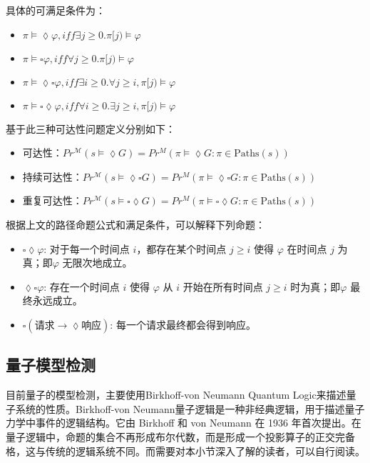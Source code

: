 具体的可满足条件为：
\begin{itemize}
    \item \(\pi\models\lozenge\varphi,iff\exists j\ge0.\pi[j)\models\varphi\)
    \item \(\pi\models\square\varphi,iff\forall j\ge 0.\pi[j)\models\varphi\)
    \item \(\pi\models\lozenge\square\varphi,iff\exists i\ge 0.\forall j\ge i,\pi[j)\models\varphi\)
    \item \(\pi\models\square\lozenge\varphi,iff\forall i\ge 0.\exists j\ge i,\pi[j)\models\varphi\)
\end{itemize}
基于此三种可达性问题定义分别如下：
\begin{itemize}
    \item 可达性：\( Pr^{\mathcal{M}}(s \models \lozenge G) = Pr^M(\pi \models \lozenge G : \pi \in \text{Paths}(s))\)
    \item 持续可达性：\( Pr^{\mathcal{M}}(s \models \lozenge \square G) = Pr^M(\pi \models \lozenge \square G : \pi \in \text{Paths}(s))\)
    \item 重复可达性：\( Pr^{\mathcal{M}}(s \models\square \lozenge G) = Pr^M(\pi \models \square\lozenge G : \pi \in \text{Paths}(s))\)
\end{itemize}
\begin{example}
    根据上文的路径命题公式和满足条件，可以解释下列命题：
    \begin{itemize}
        \item $\square\lozenge\varphi$: 对于每一个时间点 \(i\)，都存在某个时间点 \(j \geq i\) 使得 \(\varphi\) 在时间点 \(j\) 为真；即\(\varphi\) 无限次地成立。
        \item $\lozenge\square\varphi$: 存在一个时间点 \(i\) 使得 \(\varphi\) 从 \(i\) 开始在所有时间点 \(j \geq i\) 时为真；即\(\varphi\) 最终永远成立。
        \item $\square(\text{请求} \rightarrow \lozenge\text{响应})$: 每一个请求最终都会得到响应。
      \end{itemize}
\end{example}
\subsection{量子模型检测}
目前量子的模型检测，主要使用Birkhoff-von Neumann Quantum Logic来描述量子系统的性质\citep{birkhoff1987logic}。Birkhoff-von Neumann量子逻辑是一种非经典逻辑，用于描述量子力学中事件的逻辑结构。它由 Birkhoff 和 von Neumann 在 1936 年首次提出。在量子逻辑中，命题的集合不再形成布尔代数，而是形成一个投影算子的正交完备格，这与传统的逻辑系统不同。而需要对本小节深入了解的读者，可以自行阅读\citep{2021}。

